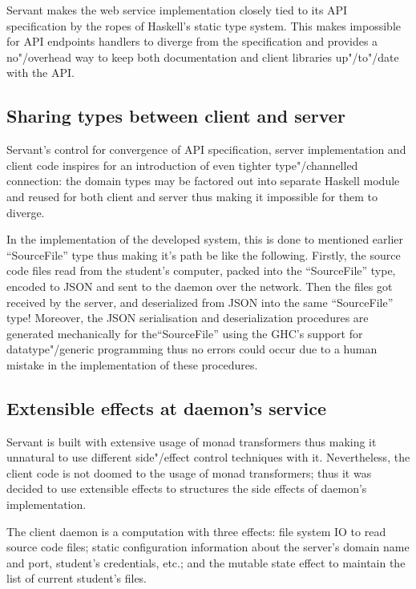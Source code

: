 Servant makes the web service implementation closely tied to its API specification
by the ropes of Haskell's static type system. This makes impossible for API endpoints
handlers to diverge from the specification and provides a no"/overhead way to
keep both documentation and client libraries up"/to"/date with the API.

\subsection{Sharing types between client and server}

Servant's control for convergence of API specification, server implementation and
client code inspires for an introduction of even tighter type"/channelled connection:
the domain types may be factored out into separate Haskell module and reused for
both client and server thus making it impossible for them to diverge.

In the implementation of the developed system, this is done to mentioned earlier ``SourceFile''
type thus making it's path be like the following. Firstly, the source code files read from the
student's computer, packed into the ``SourceFile'' type, encoded to JSON and sent to the daemon
over the network. Then the files got received by the server, and deserialized from JSON into the
same ``SourceFile'' type! Moreover, the JSON serialisation and deserialization procedures are
generated mechanically for the``SourceFile'' using the GHC's support for datatype"/generic
programming thus no errors could occur due to a human mistake in the implementation of these
procedures.

\subsection{Extensible effects at daemon's service}

Servant is built with extensive usage of monad transformers thus making it
unnatural to use different side"/effect control techniques with it. Nevertheless,
the client code is not doomed to the usage of monad transformers; thus it was decided
to use extensible effects to structures the side effects of daemon's implementation.

The client daemon is a computation with three effects: file system IO to read source
code files; static configuration information about the server's domain name and port,
student's credentials, etc.; and the mutable state effect to maintain the list of current
student's files.

